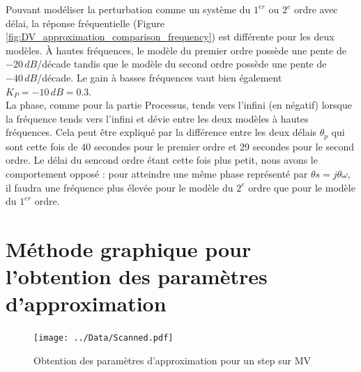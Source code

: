 \documentclass{article}
\begin{document}
Pouvant modéliser la perturbation comme un système du $1^{er}$ ou $2^{e}$ ordre avec délai, la réponse fréquentielle (Figure \ref{fig:DV_approximation_comparison_frequency}) est différente pour les deux modèles.
À hautes fréquences, le modèle du premier ordre possède une pente de $-20\,dB$/décade tandis que le modèle du second ordre possède une pente de $-40\,dB$/décade.
Le gain à basses fréquences vaut bien également $K_P = -10\,dB = 0.3$.\\
La phase, comme pour la partie Processus, tends vers l'infini (en négatif) lorsque la fréquence tends vers l'infini et dévie entre les deux modèles à hautes fréquences.
Cela peut être expliqué par la différence entre les deux délais $\theta_p$ qui sont cette fois de 40 secondes pour le premier ordre et 29 secondes pour le second ordre.
Le délai du sencond ordre étant cette fois plus petit, nous avons le comportement opposé : pour atteindre une même phase représenté par $\theta s = j\theta\omega$, il faudra une fréquence plus élevée pour le modèle du $2^{e}$ ordre que pour le modèle du $1^{er}$ ordre. 

\appendix
\newpage
\section{Méthode graphique pour l'obtention des paramètres d'approximation}
\label{appendix:MV_graphical_method}
\begin{figure}[h]
    \centering
    \texttt{[image: ../Data/Scanned.pdf]}
    \caption{Obtention des paramètres d'approximation pour un step sur MV}
\end{figure}
\end{document}
